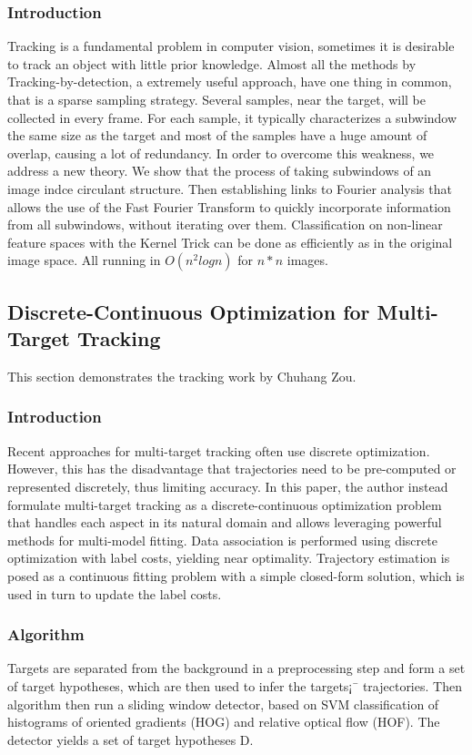 \documentclass{acm_proc_article-sp}
\begin{document}
\subsubsection{Introduction}
Tracking is a fundamental problem in computer vision, sometimes it is desirable to track an object with little prior knowledge. Almost all the methods by Tracking-by-detection, a extremely useful approach, have one thing in common, that is a sparse sampling strategy. Several samples, near the target, will be collected in every frame. For each sample, it typically characterizes a subwindow the same size as the target and most of the samples have a huge amount of overlap, causing a lot of redundancy. In order to overcome this weakness, we address a new theory. We show that the process of taking subwindows of an image indce circulant structure. Then establishing links to Fourier analysis that allows the use of the Fast Fourier Transform to quickly incorporate information from all subwindows, without iterating over them. Classification on non-linear feature spaces with the Kernel Trick can be done as efficiently as in the original image space. All running in $O(n^2 logn)$ for $n * n$ images.


\subsection{Discrete-Continuous Optimization for Multi-Target Tracking}
This section demonstrates the tracking work by Chuhang Zou.

\subsubsection{Introduction}
Recent approaches for multi-target tracking often use discrete optimization. However, this has the disadvantage that trajectories need to be pre-computed or represented discretely, thus limiting accuracy. In this paper, the author instead formulate multi-target tracking as a discrete-continuous optimization problem that handles each aspect in its natural domain and allows leveraging powerful methods for multi-model fitting. Data association is performed using discrete optimization with label costs, yielding near optimality. Trajectory estimation is posed as a continuous fitting problem with a simple closed-form solution, which is used in turn to update the label costs.

\subsubsection{Algorithm}
Targets are separated from the background in a preprocessing step and form a set of target hypotheses, which are then used to infer the targets¡¯ trajectories. Then algorithm then run a sliding window detector, based on SVM classification of histograms of oriented gradients (HOG) and relative optical flow (HOF). The detector yields a set of target hypotheses D.
\end{document}
